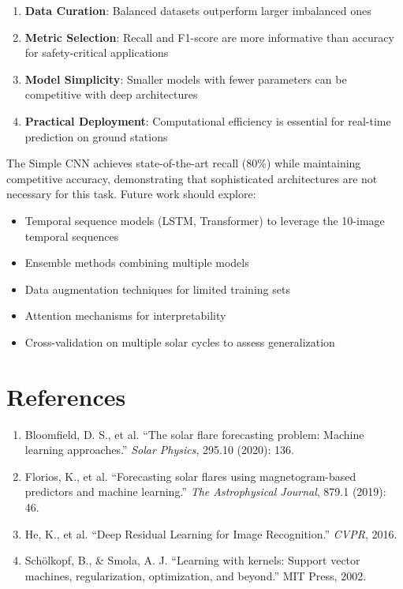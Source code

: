 \documentclass[11pt,a4paper]{article}
\begin{document}
\begin{enumerate}
    \item \textbf{Data Curation}: Balanced datasets outperform larger imbalanced ones
    \item \textbf{Metric Selection}: Recall and F1-score are more informative than accuracy for safety-critical applications
    \item \textbf{Model Simplicity}: Smaller models with fewer parameters can be competitive with deep architectures
    \item \textbf{Practical Deployment}: Computational efficiency is essential for real-time prediction on ground stations
\end{enumerate}

The Simple CNN achieves state-of-the-art recall (80\%) while maintaining competitive accuracy, demonstrating that sophisticated architectures are not necessary for this task. Future work should explore:

\begin{itemize}
    \item Temporal sequence models (LSTM, Transformer) to leverage the 10-image temporal sequences
    \item Ensemble methods combining multiple models
    \item Data augmentation techniques for limited training sets
    \item Attention mechanisms for interpretability
    \item Cross-validation on multiple solar cycles to assess generalization
\end{itemize}

\section*{References}

\begin{enumerate}
    \item Bloomfield, D. S., et al. ``The solar flare forecasting problem: Machine learning approaches.'' \textit{Solar Physics}, 295.10 (2020): 136.
    \item Florios, K., et al. ``Forecasting solar flares using magnetogram-based predictors and machine learning.'' \textit{The Astrophysical Journal}, 879.1 (2019): 46.
    \item He, K., et al. ``Deep Residual Learning for Image Recognition.'' \textit{CVPR}, 2016.
    \item Schölkopf, B., \& Smola, A. J. ``Learning with kernels: Support vector machines, regularization, optimization, and beyond.'' MIT Press, 2002.
\end{enumerate}
\end{document}

